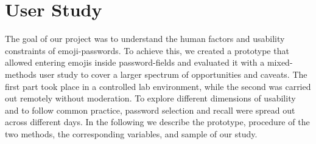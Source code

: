 

\section{User Study}
The goal of our project was to understand the human factors and usability constraints of emoji-passwords. To achieve this, we created a prototype that allowed entering emojis inside password-fields and evaluated it with a mixed-methods user study to cover a larger spectrum of opportunities and caveats. The first part took place in a controlled lab environment, while the second was carried out remotely without moderation. To explore different dimensions of usability and to follow common practice, password selection and recall were spread out across different days. In the following we describe the prototype, procedure of the two methods, the corresponding variables, and sample of our study. 

